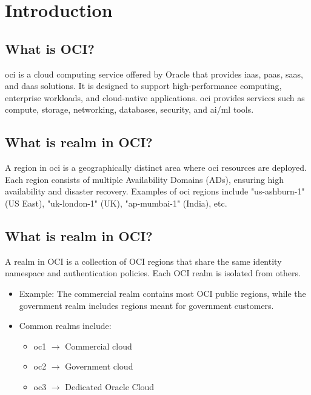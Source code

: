 \documentclass[../main.tex]{subfiles}
\begin{document}
\chapter{Introduction}
\section{What is OCI?}
\acrfull{oci} is a cloud computing service offered by Oracle that provides \acrfull{iaas}, \acrfull{paas}, \acrfull{saas}, and \acrfull{daas} solutions.
It is designed to support high-performance computing, enterprise workloads, and cloud-native applications.
\acrshort{oci} provides services such as compute, storage, networking, databases, security, and \acrshort{ai}/\acrshort{ml} tools.

\section{What is realm in OCI?}
A region in \acrshort{oci} is a geographically distinct area where \acrshort{oci} resources are deployed.
Each region consists of multiple Availability Domains (ADs), ensuring high availability and disaster recovery.
Examples of \acrshort{oci} regions include "us-ashburn-1" (US East), "uk-london-1" (UK), "ap-mumbai-1" (India), etc.
\section{What is realm in OCI?}
A realm in OCI is a collection of OCI regions that share the same identity namespace and authentication policies.
Each OCI realm is isolated from others.
\begin{itemize}
  \item {Example: The commercial realm contains most OCI public regions, while the government realm includes regions meant for government customers.}
  \item {Common realms include:
      \begin{itemize}
        \item oc1 $\rightarrow$ Commercial cloud
        \item oc2 $\rightarrow$ Government cloud
        \item oc3 $\rightarrow$ Dedicated Oracle Cloud
      \end{itemize}
    }
\end{itemize}

\end{document}
